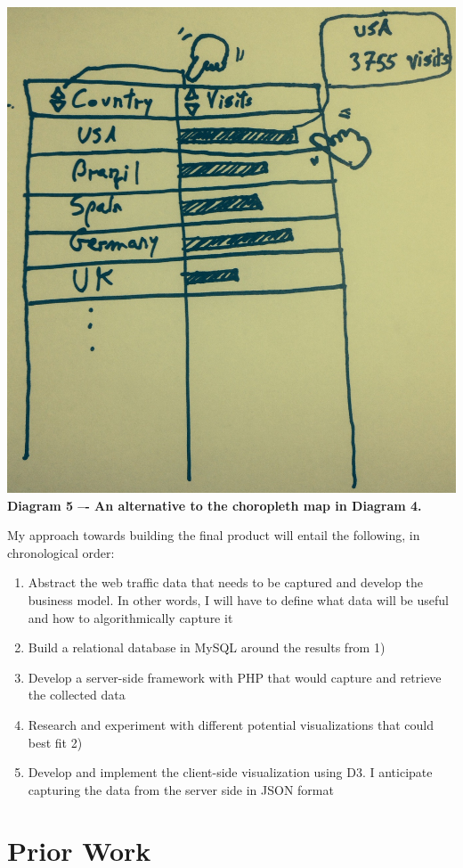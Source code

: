 \documentclass[12pt]{article}
\begin{document}
\noindent\includegraphics[scale=0.3]{img/table}
\noindent\textbf{Diagram 5 –- An alternative to the choropleth map in Diagram 4.}

My approach towards building the final product will entail the following, in chronological order:
\begin{enumerate}
\item Abstract the web traffic data that needs to be captured and develop the business model. In other words, I will have to define what data will be useful and how to algorithmically capture it
\item Build a relational database in MySQL around the results from 1)
\item Develop a server-side framework with PHP that would capture and retrieve the collected data
\item Research and experiment with different potential visualizations that could best fit 2)
\item Develop and implement the client-side visualization using D3. I anticipate capturing the data from the server side in JSON format
\end{enumerate}

\vfill

\section{Prior Work}
\end{document}
